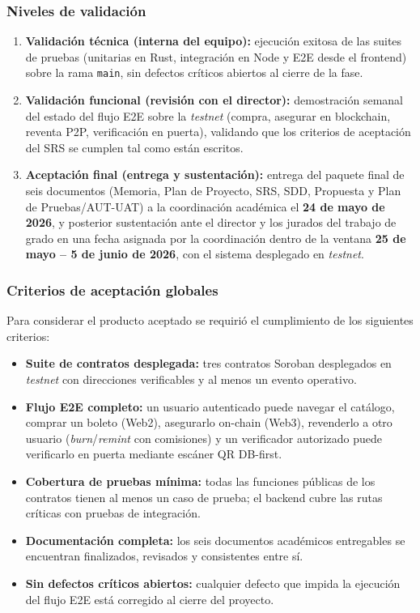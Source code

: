 \documentclass[12pt,oneside]{report}
\begin{document}
      \subsubsection{Niveles de validación}
      \begin{enumerate}
        \item \textbf{Validación técnica (interna del equipo):} ejecución exitosa de las suites de pruebas (unitarias en Rust, integración en Node y E2E desde el frontend) sobre la rama \texttt{main}, sin defectos críticos abiertos al cierre de la fase.
        \item \textbf{Validación funcional (revisión con el director):} demostración semanal del estado del flujo E2E sobre la \textit{testnet} (compra, asegurar en blockchain, reventa P2P, verificación en puerta), validando que los criterios de aceptación del SRS se cumplen tal como están escritos.
        \item \textbf{Aceptación final (entrega y sustentación):} entrega del paquete final de seis documentos (Memoria, Plan de Proyecto, SRS, SDD, Propuesta y Plan de Pruebas/AUT-UAT) a la coordinación académica el \textbf{24 de mayo de 2026}, y posterior sustentación ante el director y los jurados del trabajo de grado en una fecha asignada por la coordinación dentro de la ventana \textbf{25 de mayo -- 5 de junio de 2026}, con el sistema desplegado en \textit{testnet}.
      \end{enumerate}

      \subsubsection{Criterios de aceptación globales}
      Para considerar el producto aceptado se requirió el cumplimiento de los siguientes criterios:
      \begin{itemize}
        \item \textbf{Suite de contratos desplegada:} tres contratos Soroban desplegados en \textit{testnet} con direcciones verificables y al menos un evento operativo.
        \item \textbf{Flujo E2E completo:} un usuario autenticado puede navegar el catálogo, comprar un boleto (Web2), asegurarlo on-chain (Web3), revenderlo a otro usuario (\textit{burn}/\textit{remint} con comisiones) y un verificador autorizado puede verificarlo en puerta mediante escáner QR DB-first.
        \item \textbf{Cobertura de pruebas mínima:} todas las funciones públicas de los contratos tienen al menos un caso de prueba; el backend cubre las rutas críticas con pruebas de integración.
        \item \textbf{Documentación completa:} los seis documentos académicos entregables se encuentran finalizados, revisados y consistentes entre sí.
        \item \textbf{Sin defectos críticos abiertos:} cualquier defecto que impida la ejecución del flujo E2E está corregido al cierre del proyecto.
      \end{itemize}
\end{document}
